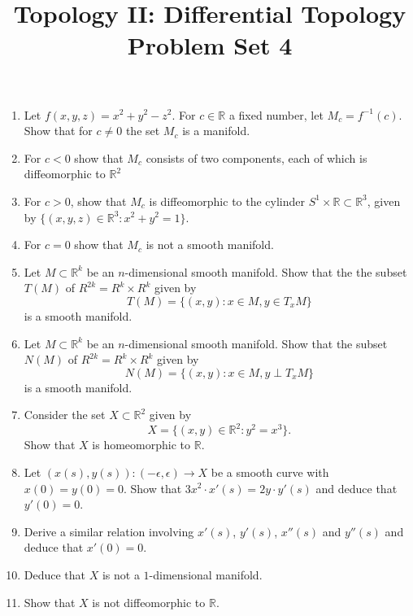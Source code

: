 \documentclass[12pt]{article}
\newcommand{\R}{\mathbb{R}}
\begin{document}
\title{Topology II: Differential Topology\\
Problem Set 4} 
\date{}
\maketitle

\thispagestyle{empty}

\begin{enumerate}

\item Let $f(x,y,z)=x^2+y^2-z^2$. For $c\in \R$ a fixed number, let
  $M_c=f^{-1}(c)$. Show that for $c\neq 0$ the set $M_c$ is a manifold.

\item For $c<0$ show that $M_c$ consists of two components, each of
  which is diffeomorphic to $\R^2$

\item For $c>0$, show that $M_c$ is diffeomorphic to the cylinder
  $S^1\times \R\subset \R^3$, given by $\{(x,y,z)\in\R^3:
  x^2+y^2=1\}$.

\item For $c=0$ show that $M_c$ is not a smooth manifold.

\item Let $M\subset \R^k$ be an $n$-dimensional smooth manifold. Show
that the the subset $T(M)$ of $R^{2k}=R^k\times R^k$ given by
$$T(M)=\{(x,y):x\in M, y\in T_x M\}$$ 
is a smooth manifold.

\item Let $M\subset \R^k$ be an $n$-dimensional smooth manifold. Show
that the subset $N(M)$ of $R^{2k}=R^k\times R^k$ given by
$$N(M)=\{(x,y):x\in M, y\perp T_x M\}$$
is a smooth manifold.

\item Consider the set $X\subset\R^2$ given by 
$$X=\{(x,y)\in \R^2: y^2=x^3\}.$$
Show that $X$ is homeomorphic to $\R$.

\item Let $(x(s),y(s)):(-\epsilon,\epsilon)\to X$ be a smooth curve
  with $x(0)=y(0)=0$. Show that $3x^2\cdot x'(s)=2y\cdot y'(s)$ and
  deduce that $y'(0)=0$.

\item Derive a similar relation involving $x'(s)$, $y'(s)$, $x''(s)$
  and $y''(s)$ and deduce that $x'(0)=0$.

\item Deduce that $X$ is not a $1$-dimensional manifold.

\item Show that $X$ is not diffeomorphic to $\R$.

\end{enumerate}
\end{document}
